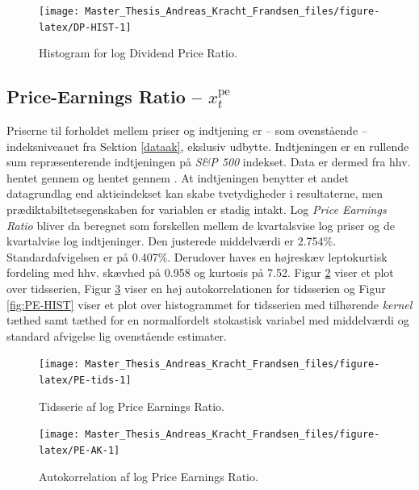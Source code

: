 \documentclass[
  a4paper,
  oneside]{memoir}
\begin{document}
\begin{figure}[H]

{\centering \texttt{[image: Master\_Thesis\_Andreas\_Kracht\_Frandsen\_files/figure-latex/DP-HIST-1]} 

}

\caption{Histogram for log Dividend Price Ratio.}\label{fig:DP-HIST}
\end{figure}

\hypertarget{price-earnings-ratio-x_ttextpe}{%
\subsection{\texorpdfstring{Price-Earnings Ratio -- \(x_t^{\text{pe}}\)}{Price-Earnings Ratio -- x\_t\^{}\{\textbackslash text\{pe\}\}}}\label{price-earnings-ratio-x_ttextpe}}

Priserne til forholdet mellem priser og indtjening er -- som ovenstående -- indeksniveauet fra Sektion \ref{dataak}, ekslusiv udbytte. Indtjeningen er en rullende sum repræsenterende indtjeningen på \emph{S\&P 500} indekset. Data er dermed fra hhv. \citep{CRSPakt} hentet gennem \citep{WRDSakt} og \citep{Shiller2020} hentet gennem \citep{Goyal2007}. At indtjeningen benytter et andet datagrundlag end aktieindekset kan skabe tvetydigheder i resultaterne, men prædiktabiltetsegenskaben for variablen er stadig intakt. Log \emph{Price Earnings Ratio} bliver da beregnet som forskellen mellem de kvartalsvise log priser og de kvartalvise log indtjeninger. Den justerede middelværdi er 2.754\(\%\). Standardafvigelsen er på 0.407\(\%\). Derudover haves en højreskæv leptokurtisk fordeling med hhv. skævhed på 0.958 og kurtosis på 7.52. Figur \ref{fig:PE-tids} viser et plot over tidsserien, Figur \ref{fig:PE-AK} viser en høj autokorrelationen for tidsserien og Figur \ref{fig:PE-HIST} viser et plot over histogrammet for tidsserien med tilhørende \emph{kernel} tæthed samt tæthed for en normalfordelt stokastisk variabel med middelværdi og standard afvigelse lig ovenstående estimater.

\begin{figure}[H]

{\centering \texttt{[image: Master\_Thesis\_Andreas\_Kracht\_Frandsen\_files/figure-latex/PE-tids-1]} 

}

\caption{Tidsserie af log Price Earnings Ratio.}\label{fig:PE-tids}
\end{figure}

\begin{figure}[H]

{\centering \texttt{[image: Master\_Thesis\_Andreas\_Kracht\_Frandsen\_files/figure-latex/PE-AK-1]} 

}

\caption{Autokorrelation af log Price Earnings Ratio.}\label{fig:PE-AK}
\end{figure}
\end{document}
